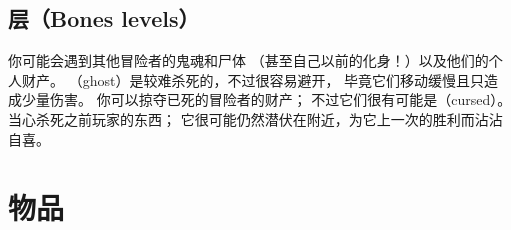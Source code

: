 \documentclass[a4paper, 10pt]{article}
\begin{document}
\subsection*{\zhTransBones{}层（Bones levels）}

你可能会遇到其他冒险者的鬼魂和尸体
（甚至自己以前的化身！）以及他们的个人财产。
\zhTransGhosts（ghost）是较难杀死的，不过很容易避开，
毕竟它们移动缓慢且只造成少量伤害。
你可以掠夺已死的冒险者的财产；
不过它们很有可能是\zhTransCursed（cursed）。
当心杀死之前玩家的东西；
它很可能仍然潜伏在附近，为它上一次的胜利而沾沾自喜。

\section{物品}
\end{document}
